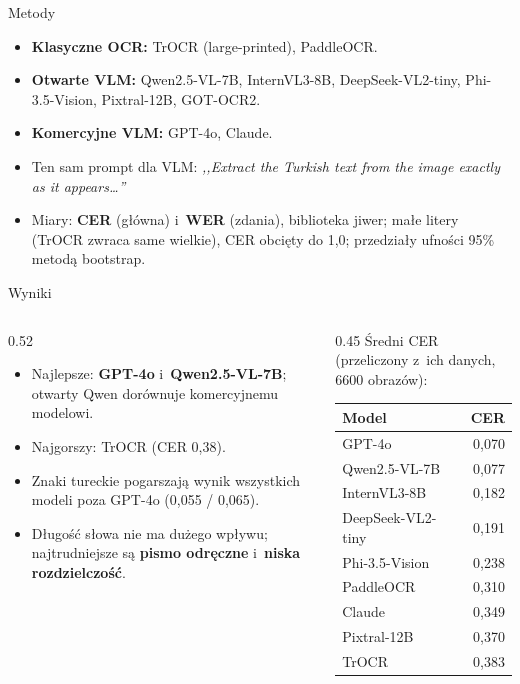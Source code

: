 \documentclass[aspectratio=169,11pt]{beamer}
\begin{document}
\begin{frame}{Metody}
  \begin{itemize}
    \item \textbf{Klasyczne OCR:} TrOCR (large-printed), PaddleOCR.
    \item \textbf{Otwarte VLM:} Qwen2.5-VL-7B, InternVL3-8B, DeepSeek-VL2-tiny, Phi-3.5-Vision,
      Pixtral-12B, GOT-OCR2.
    \item \textbf{Komercyjne VLM:} GPT-4o, Claude.
    \item Ten sam prompt dla VLM: \emph{,,Extract the Turkish text from the image exactly as it appears\ldots''}
    \item Miary: \textbf{CER} (główna) i~\textbf{WER} (zdania), biblioteka jiwer; małe litery
      (TrOCR zwraca same wielkie), CER obcięty do 1,0; przedziały ufności 95\% metodą bootstrap.
  \end{itemize}
\end{frame}

\begin{frame}{Wyniki}
  \begin{columns}[T]
    \begin{column}{0.52\textwidth}
      \begin{itemize}
        \item Najlepsze: \textbf{GPT-4o} i~\textbf{Qwen2.5-VL-7B}; otwarty Qwen dorównuje komercyjnemu modelowi.
        \item Najgorszy: TrOCR (CER 0,38).
        \item Znaki tureckie pogarszają wynik wszystkich modeli poza GPT-4o (0,055 / 0,065).
        \item Długość słowa nie ma dużego wpływu; najtrudniejsze są \textbf{pismo odręczne}
          i~\textbf{niska rozdzielczość}.
      \end{itemize}
    \end{column}
    \begin{column}{0.45\textwidth}
      \footnotesize
      Średni CER (przeliczony z~ich danych, 6600 obrazów):\\[3pt]
      \begin{tabular}{lr}
        \toprule
        Model & CER \\
        \midrule
        GPT-4o & 0,070 \\
        Qwen2.5-VL-7B & 0,077 \\
        InternVL3-8B & 0,182 \\
        DeepSeek-VL2-tiny & 0,191 \\
        Phi-3.5-Vision & 0,238 \\
        PaddleOCR & 0,310 \\
        Claude & 0,349 \\
        Pixtral-12B & 0,370 \\
        TrOCR & 0,383 \\
        \bottomrule
      \end{tabular}
    \end{column}
  \end{columns}
\end{frame}
\end{document}
